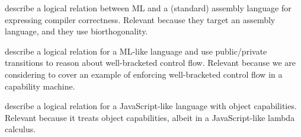 \documentclass{article}
\begin{document}
\cite{Hur:2011:KLR:1926385.1926402} describe a logical relation between ML and
a (standard) assembly language for expressing compiler correctness.  Relevant
because they target an assembly language, and they use biorthogonality.

\cite{Dreyer:2010:IHS:1863543.1863566} describe a logical relation for a ML-like
language and use public/private transitions to reason about well-bracketed
control flow. Relevant because we are considering to cover an example of
enforcing well-bracketed control flow in a capability machine.

\cite{Devriese:2016ObjCap} describe a logical relation for a JavaScript-like
language with object capabilities.  Relevant because it treats object
capabilities, albeit in a JavaScript-like lambda calculus.



\end{document}
